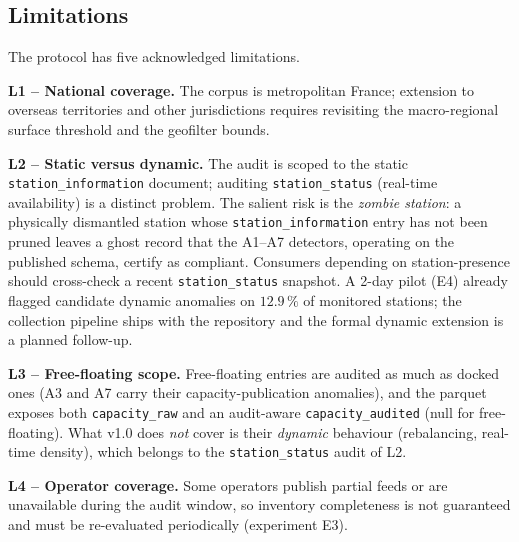 \documentclass[11pt,a4paper]{article}
\begin{document}
\subsection{Limitations}\label{secLimitations}
The protocol has five acknowledged limitations.

\textbf{L1 -- National coverage.} The corpus is metropolitan France;
extension to overseas territories and other jurisdictions requires
revisiting the macro-regional surface threshold and the geofilter bounds.

\textbf{L2 -- Static versus dynamic.} The audit is scoped to the static
\texttt{station\_information} document; auditing \texttt{station\_status}
(real-time availability) is a distinct problem. The salient risk is the
\emph{zombie station}: a physically dismantled station whose
\texttt{station\_information} entry has not been pruned leaves a ghost
record that the A1--A7 detectors, operating on the published schema,
certify as compliant. Consumers depending on station-presence should
cross-check a recent \texttt{station\_status} snapshot. A 2-day pilot (E4)
already flagged candidate dynamic anomalies on $12.9\,\%$ of monitored
stations; the collection pipeline ships with the repository and the formal
dynamic extension is a planned follow-up.

\textbf{L3 -- Free-floating scope.} Free-floating entries are audited as
much as docked ones (A3 and A7 carry their capacity-publication anomalies),
and the parquet exposes both \texttt{capacity\_raw} and an audit-aware
\texttt{capacity\_audited} (null for free-floating). What v1.0 does
\emph{not} cover is their \emph{dynamic} behaviour (rebalancing, real-time
density), which belongs to the \texttt{station\_status} audit of L2.

\textbf{L4 -- Operator coverage.} Some operators publish partial feeds or
are unavailable during the audit window, so inventory completeness is not
guaranteed and must be re-evaluated periodically (experiment E3).
\end{document}
